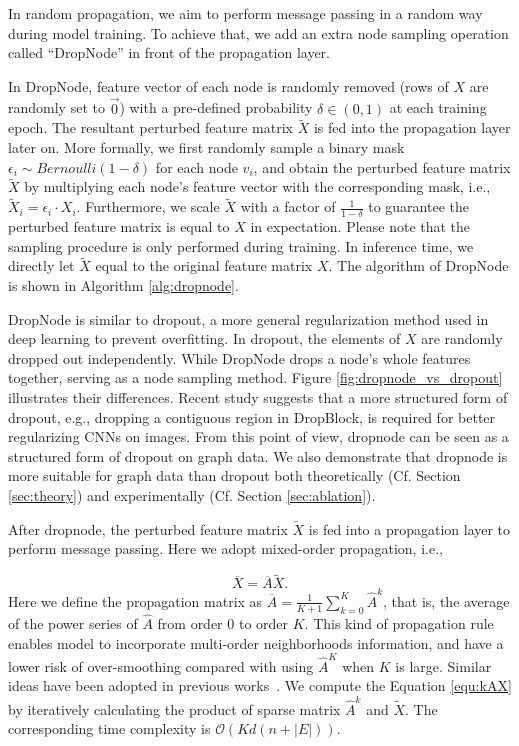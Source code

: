 {\label{sec:randpro}


In random propagation, we aim to perform message passing in a random way during model training. To achieve that, we add an extra node sampling operation called ``DropNode'' in front of the propagation layer.


 In DropNode, feature vector of each node is randomly removed (rows of $X$ are randomly set to $\vec{0}$) with a pre-defined probability $\delta \in (0,1)$ at each training epoch. The resultant perturbed feature matrix $\widetilde{X}$ is fed into the propagation layer later on.
More formally, we first randomly sample a binary mask $\epsilon_i \sim Bernoulli(1-\delta)$ for each node $v_i$, and obtain the perturbed feature matrix $\widetilde{X}$ by multiplying each node's feature vector with the corresponding mask, i.e., $\widetilde{X}_i=\epsilon_i \cdot X_i$. Furthermore, we scale $\widetilde{X}$ with a factor of $\frac{1}{1-\delta}$ to guarantee the perturbed feature matrix is equal to $X$ in expectation. Please note that the sampling procedure is only performed during training. In inference time, we directly let $\widetilde{X}$ equal to the original feature matrix $X$. The algorithm of DropNode is shown in Algorithm \ref{alg:dropnode}. 

DropNode is similar to dropout\cite{srivastava2014dropout}, a more general regularization method used in deep learning to prevent overfitting. 
In dropout, the elements of $X$ are randomly dropped out independently. While DropNode drops a node's whole features together, serving as a node sampling method. 
Figure \ref{fig:dropnode_vs_dropout} illustrates their differences.
Recent study suggests that a more structured form of dropout, e.g., dropping a contiguous region in DropBlock\cite{ghiasi2018dropblock}, is required for better regularizing CNNs on images. From this point of view, dropnode can be seen as a structured form of dropout on graph data.
We also demonstrate that dropnode is more suitable for graph data than dropout both theoretically (Cf. Section \ref{sec:theory}) and experimentally (Cf. Section \ref{sec:ablation}). 




After dropnode, the perturbed feature matrix $\widetilde{X}$ is fed into a propagation layer to perform message passing. Here we adopt mixed-order propagation, i.e.,

\begin{equation}
\label{equ:kAX}
	\overline{X} = \overline{A} \widetilde{X}.
\end{equation}
Here we define the propagation matrix as $\overline{A} =  \frac{1}{K+1}\sum_{k=0}^K\hat{A}^k$, that is, the average of the power series of $\hat{A}$ from order 0 to order $K$. This kind of propagation rule enables model to incorporate multi-order neighborhoods information, and have a lower risk of over-smoothing compared with using $\hat{A}^K$ when $K$ is large. Similar ideas have been adopted in previous works~\cite{abu2019mixhop,abu2018n}. We compute the Equation \ref{equ:kAX} by iteratively calculating the product of sparse  matrix $\hat{A}^k$ and $\widetilde{X}$. The corresponding time complexity is $\mathcal{O}(Kd(n+|E|))$.


}

